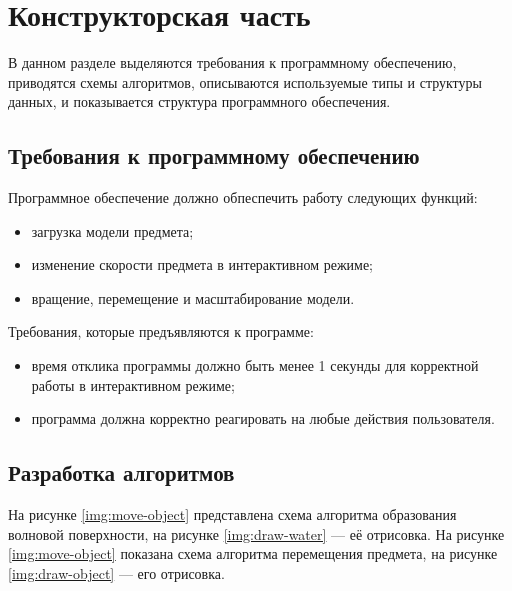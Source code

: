 \chapter{Конструкторская часть}

В данном разделе выделяются требования к программному обеспечению, приводятся схемы алгоритмов, описываются используемые типы и структуры данных, и показывается структура программного обеспечения.

\section{Требования к программному обеспечению}

Программное обеспечение должно обпеспечить работу следующих функций:

\begin{itemize}
	\item загрузка модели предмета;
	\item изменение скорости предмета в интерактивном режиме;
	\item вращение, перемещение и масштабирование модели.
\end{itemize}

Требования, которые предъявляются к программе:

\begin{itemize}
	\item время отклика программы должно быть менее 1 секунды для корректной работы в интерактивном режиме;
	\item программа должна корректно реагировать на любые действия пользователя.
\end{itemize}

\section{Разработка алгоритмов}

На рисунке \ref{img:move-object} представлена схема алгоритма образования волновой поверхности, на рисунке \ref{img:draw-water} --- её отрисовка. На рисунке \ref{img:move-object} показана схема алгоритма перемещения предмета, на рисунке \ref{img:draw-object} --- его отрисовка.

